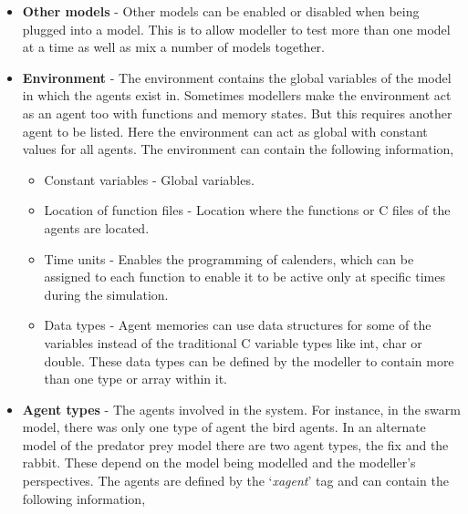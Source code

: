 \documentclass[a4paper,11pt]{article}
\begin{document}
\begin{itemize}
\item \textbf{Other models} - Other models can be enabled or disabled when being plugged into a model. This is to allow modeller to test more than one model at a time as well as mix a number of models together.
\item \textbf{Environment} - The environment contains the global variables of the model in which the agents exist in. Sometimes modellers make the environment act as an agent too with functions and memory states. But this requires another agent to be listed. Here the environment can act as global with constant values for all
agents. The environment can contain the following information,
\begin{itemize}
\item Constant variables - Global variables.
\item Location of function files - Location where the functions or C files of the agents are located.
\item Time units - Enables the programming of calenders, which can be assigned to each function to enable it to be active only at specific times during the simulation.
\item Data types - Agent memories can use data structures for some of the variables instead of the traditional C variable types like int, char or double. These data types can be defined by the modeller to contain more than one type or array within it.
\end{itemize}
\item \textbf{Agent types} - The agents involved in the system. For instance, in the swarm model, there was only one type of agent the bird agents. In an alternate model of the predator prey model there are two agent types, the fix and the rabbit. These depend on the model being modelled and the modeller's
perspectives. The agents are defined by the `\emph{xagent}' tag and
can contain the following information,
\begin{itemize}

\end{itemize}
\end{itemize}
\end{document}
